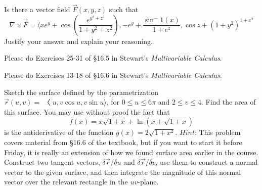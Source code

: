 \documentclass[12pt]{exam}
\begin{document}
\begin{questions}

\question Is there a vector field $\overrightarrow{F}(x, y, z)$ such that
    \[\nabla \times \overrightarrow{F} = \langle xe^y + \cos\left(\frac{e^{y^2 + z^2}}{1 + y^2 + z^2}\right), -e^y + \frac{\sin^-1(x)}{1+e^z}, \cos z + (1 + y^2)^{1+x^2} \]
    Justify your answer and explain your reasoning.

\question Please do Exercises 25-31 of §16.5 in Stewart's \textit{Multivariable Calculus}.

\question Please do Exercises 13-18 of §16.6 in Stewart’s \textit{Multivariable Calculus}.
    \begin{solution}
        \setcounter{question}{12}
        \begin{questions}
            \question 
        \end{questions}
    \end{solution}

\question Sketch the surface defined by the parametrization $\overrightarrow{r} (u, v) = 〈u, v \cos u, v \sin u \rangle$, for $0 \leq u \leq 6\pi$ and $2 \leq v \leq 4$. Find the area of this surface. You may use without proof the fact that
\[f (x) = x\sqrt{1 + x} + \ln(x + \sqrt{1 + x})\]
is the antiderivative of the function $g(x) = 2\sqrt{1 + x^2}$. $Hint$: This problem covers material from §16.6 of the textbook, but if you want to start it before Friday, it is really an extension of how we found surface area earlier in the course. Construct two tangent vectors, $\delta \overrightarrow{r} / \delta u$ and $\delta \overrightarrow{r} / \delta v$, use them to construct a normal vector to the given surface, and then integrate the magnitude of this normal vector over the relevant rectangle in the $uv$-plane.

\end{questions}
\end{document}
